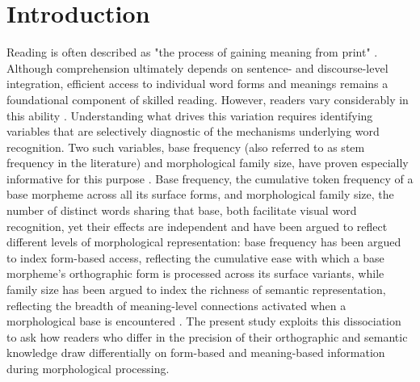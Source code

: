 	\section{Introduction}
	
	Reading is often described as "the process of gaining meaning from print" \citep[][p.~34]{raynerHowPsychologicalScience2001}. Although comprehension ultimately depends on sentence- and discourse-level integration, efficient access to individual word forms and meanings remains a foundational component of skilled reading. However, readers vary considerably in this ability \citep{perfettiReadingAbilityLexical2007, castlesHowDoesOrthographic2006, stanovichExposurePrintOrthographic1989}. Understanding what drives this variation requires identifying variables that are selectively diagnostic of the mechanisms underlying word recognition. Two such variables, base frequency (also referred to as stem frequency in the literature) and morphological family size, have proven especially informative for this purpose \citep{taftMorphologicalDecompositionReverse2004, taftRecognitionAffixedWords1979, dejongMorphologicalFamilySize2000, bertramEffectsFamilySize2000}. Base frequency, the cumulative token frequency of a base morpheme across all its surface forms, and morphological family size, the number of distinct words sharing that base, both facilitate visual word recognition, yet their effects are independent and have been argued to reflect different levels of morphological representation: base frequency has been argued to index form-based access, reflecting the cumulative ease with which a base morpheme's orthographic form is processed across its surface variants, while family size has been argued to index the richness of semantic representation, reflecting the breadth of meaning-level connections activated when a morphological base is encountered \citep{schreuderHowComplexSimplex1997}. The present study exploits this dissociation to ask how readers who differ in the precision of their orthographic and semantic knowledge draw differentially on form-based and meaning-based information during morphological processing.
	
